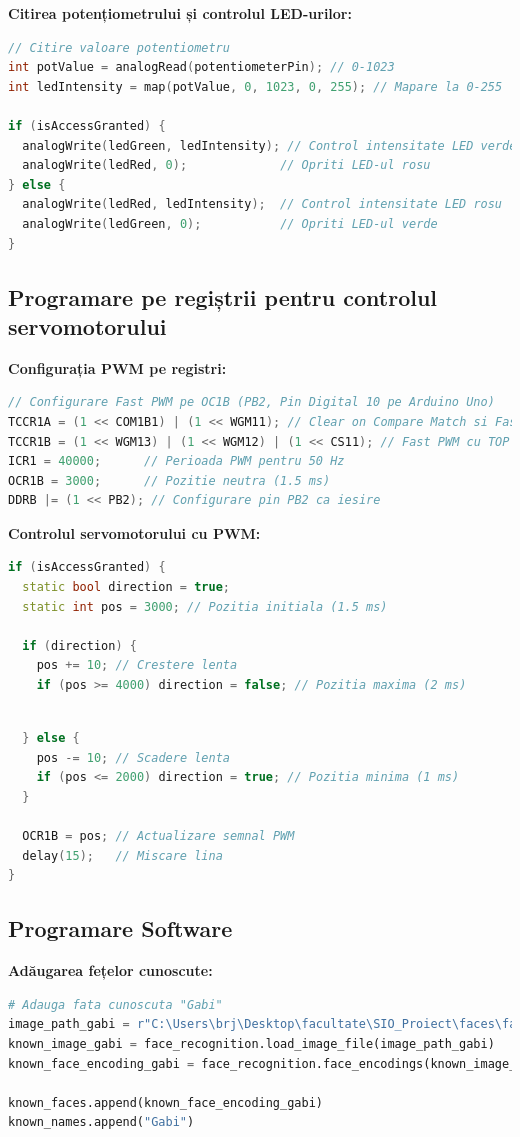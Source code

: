 \documentclass{report}
\begin{document}
\textbf{Citirea potențiometrului și controlul LED-urilor:}
\newpage
\vspace*{1cm}
\begin{lstlisting}[language=C++]
// Citire valoare potentiometru
int potValue = analogRead(potentiometerPin); // 0-1023
int ledIntensity = map(potValue, 0, 1023, 0, 255); // Mapare la 0-255

if (isAccessGranted) {
  analogWrite(ledGreen, ledIntensity); // Control intensitate LED verde
  analogWrite(ledRed, 0);             // Opriti LED-ul rosu
} else {
  analogWrite(ledRed, ledIntensity);  // Control intensitate LED rosu
  analogWrite(ledGreen, 0);           // Opriti LED-ul verde
}
\end{lstlisting}

\subsection{Programare pe regiștrii pentru controlul servomotorului}
\textbf{Configurația PWM pe registri:}
\begin{lstlisting}[language=C++]
// Configurare Fast PWM pe OC1B (PB2, Pin Digital 10 pe Arduino Uno)
TCCR1A = (1 << COM1B1) | (1 << WGM11); // Clear on Compare Match si Fast PWM
TCCR1B = (1 << WGM13) | (1 << WGM12) | (1 << CS11); // Fast PWM cu TOP in ICR1 si prescaler 8
ICR1 = 40000;      // Perioada PWM pentru 50 Hz
OCR1B = 3000;      // Pozitie neutra (1.5 ms)
DDRB |= (1 << PB2); // Configurare pin PB2 ca iesire
\end{lstlisting}

\textbf{Controlul servomotorului cu PWM:}
\begin{lstlisting}[language=C++]
if (isAccessGranted) {
  static bool direction = true;
  static int pos = 3000; // Pozitia initiala (1.5 ms)

  if (direction) {
    pos += 10; // Crestere lenta
    if (pos >= 4000) direction = false; // Pozitia maxima (2 ms)
    \end{lstlisting}
    \newpage
    \vspace*{1cm}
    \begin{lstlisting}[language=C++]
    
  } else {
    pos -= 10; // Scadere lenta
    if (pos <= 2000) direction = true; // Pozitia minima (1 ms)
  }

  OCR1B = pos; // Actualizare semnal PWM
  delay(15);   // Miscare lina
}
\end{lstlisting}

\subsection{Programare Software}
\textbf{Adăugarea fețelor cunoscute:}
\begin{lstlisting}[language=Python]
# Adauga fata cunoscuta "Gabi"
image_path_gabi = r"C:\Users\brj\Desktop\facultate\SIO_Proiect\faces\face1.jpg"
known_image_gabi = face_recognition.load_image_file(image_path_gabi)
known_face_encoding_gabi = face_recognition.face_encodings(known_image_gabi)[0]

known_faces.append(known_face_encoding_gabi)
known_names.append("Gabi")
\end{lstlisting}
\end{document}
